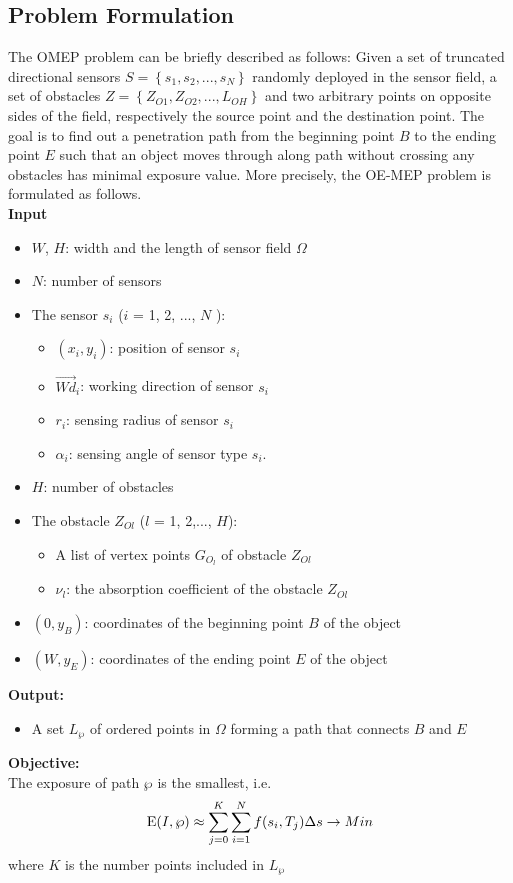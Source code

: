 \documentclass[final]{elsarticle}
\begin{document}
\subsection{Problem Formulation}
The OMEP problem can be briefly described as follows: Given a set of truncated directional sensors $S = \left\{ {{s_1},{s_2},...,{s_N}} \right\}$ randomly deployed in the sensor field, a set of obstacles $Z = \left\{ {{Z_{O1}},{Z_{O2}},...,{L_{OH}}} \right\}$ and two arbitrary points on opposite sides of the field, respectively the source point and the destination point. The goal is to find out a penetration path from the beginning point $B$ to the ending point $E$ such that an object moves through along path without crossing any obstacles has minimal exposure value. More precisely, the OE-MEP problem is formulated as follows.\\
\textbf{Input}
\begin{itemize}
		\itemsep-0.2em
		\item $W$, $H$: width and the length of sensor field $\Omega$
		\item $N$: number of sensors
		\item The sensor $s_i$ ($ i $ = 1, 2, ..., $ N $ ):
		\begin{itemize}
			 \item $({x_i},y_i)$: position of sensor $ s_i $
			 \item $\overrightarrow{Wd}_i$: working direction of sensor $s_i$
			 \item $ r_i $: sensing radius of sensor $ s_i $
			 \item ${\alpha _i}$: sensing angle of sensor type $ s_i $.
		 \end{itemize}
		 \item $H$: number of obstacles
		 \item The obstacle $Z_{Ol}$ ($ l $ = 1, 2,..., $H$): 
		 \begin{itemize}
		 	\item A list of vertex points $ G_{O_l} $ of obstacle $Z_{Ol}$
		 	\item $ \nu_l $: the absorption coefficient of the obstacle $Z_{Ol}$
		 \end{itemize}
		\item $(0, y_B)$: coordinates of the beginning point $B$ of the object
		\item $(W, y_E)$: coordinates of the ending point $E$ of the object
\end{itemize}
\textbf{Output:}
\begin{itemize}
	\item A set ${L_\wp }$ of ordered points in $\Omega $ forming a path that connects $ B $ and $ E $ 
\end{itemize}
\textbf{Objective:}\\
The exposure of path  $\wp $ is the smallest, i.e.
\begin{equation}
\label{eq9}
{\rm E}(I,\wp )  \approx \sum\limits_{j = 0}^K {\sum\limits_{i = 1}^N {f({s_i},{T_j})} } \Delta s  \to Min
\end{equation}
where $ K $ is the number points included in ${L_\wp }$
\end{document}

